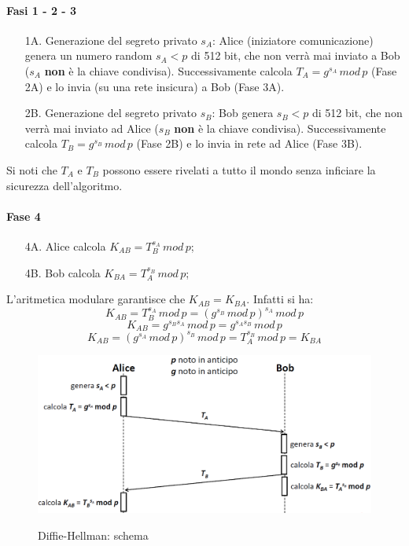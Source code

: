 \paragraph{Fasi 1 - 2 - 3}
\begin{enumerate}
\item [1A.] Generazione del segreto privato $s_{A}$: Alice (iniziatore comunicazione) genera un numero random $s_{A}<p$ di 512 bit, che non verrà mai inviato a Bob ($s_A$ \textbf{non} è la chiave condivisa). Successivamente calcola $T_{A}=g^{s_{A}} \, mod \,p$ (Fase 2A) e lo invia (su una rete insicura) a Bob (Fase 3A).
\item [2B.] Generazione del segreto privato $s_{B}$: Bob genera $s_{B}<p$ di 512 bit, che non verrà mai inviato ad Alice ($s_B$ \textbf{non} è la chiave condivisa). Successivamente calcola $T_{B}=g^{s_{B}} \, mod \, p$ (Fase 2B) e lo invia in rete ad Alice (Fase 3B).
\end{enumerate}
Si noti che $T_A$ e $T_B$ possono essere rivelati a tutto il mondo senza inficiare la sicurezza dell'algoritmo.
\paragraph{Fase 4}
\begin{enumerate}
\item [4A.] Alice calcola $K_{AB}=T_{B}^{s_{A}} \, mod \,p$;
\item [4B.] Bob calcola $K_{BA}=T_{A}^{s_{B}} \, mod \, p$;
\end{enumerate}
L'aritmetica modulare garantisce che $K_{AB}=K_{BA}$. Infatti si ha:
\begin{equation}
K_{AB} = T_{B}^{s_{A}} \, mod \,p = ({g^{s_{B}} \, mod \, p})^{s_{A}} \, mod \,p
\end{equation}
\begin{equation}
K_{AB} = g^{s_{B}s_{A}} \, mod \, p = g^{s_{A}s_{B}} \, mod \, p
\end{equation} 
\begin{equation}
K_{AB} = ({g^{s_{A}} \, mod \, p})^{s_{B}} \, mod \,p = T_{A}^{s_{B}} \, mod \, p = K_{BA}
\end{equation}
\begin{figure}[htbp]
	\centering%
	\subfigure%
	{\includegraphics[scale=0.5, keepaspectratio]{Immagini/chiave_pubblica/DiffieHellman_schema.png}}
	\caption{Diffie-Hellman: schema}
\end{figure}

